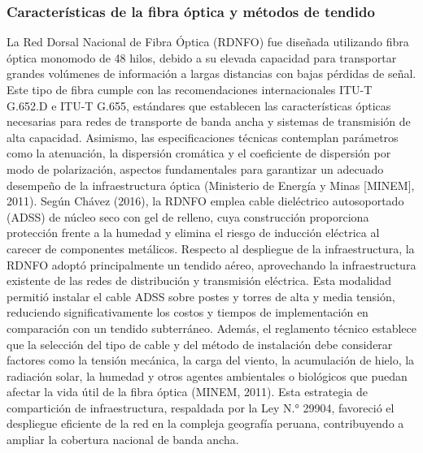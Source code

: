 \subsubsection{Características de la fibra óptica y métodos de tendido}
La Red Dorsal Nacional de Fibra Óptica (RDNFO) fue diseñada utilizando fibra óptica monomodo de 48 hilos, debido a su elevada capacidad para transportar grandes volúmenes de información a largas distancias con bajas pérdidas de señal. Este tipo de fibra cumple con las recomendaciones internacionales ITU-T G.652.D e ITU-T G.655, estándares que establecen las características ópticas necesarias para redes de transporte de banda ancha y sistemas de transmisión de alta capacidad. Asimismo, las especificaciones técnicas contemplan parámetros como la atenuación, la dispersión cromática y el coeficiente de dispersión por modo de polarización, aspectos fundamentales para garantizar un adecuado desempeño de la infraestructura óptica (Ministerio de Energía y Minas [MINEM], 2011). Según Chávez (2016), la RDNFO emplea cable dieléctrico autosoportado (ADSS) de núcleo seco con gel de relleno, cuya construcción proporciona protección frente a la humedad y elimina el riesgo de inducción eléctrica al carecer de componentes metálicos.
Respecto al despliegue de la infraestructura, la RDNFO adoptó principalmente un tendido aéreo, aprovechando la infraestructura existente de las redes de distribución y transmisión eléctrica. Esta modalidad permitió instalar el cable ADSS sobre postes y torres de alta y media tensión, reduciendo significativamente los costos y tiempos de implementación en comparación con un tendido subterráneo. Además, el reglamento técnico establece que la selección del tipo de cable y del método de instalación debe considerar factores como la tensión mecánica, la carga del viento, la acumulación de hielo, la radiación solar, la humedad y otros agentes ambientales o biológicos que puedan afectar la vida útil de la fibra óptica (MINEM, 2011). Esta estrategia de compartición de infraestructura, respaldada por la Ley N.° 29904, favoreció el despliegue eficiente de la red en la compleja geografía peruana, contribuyendo a ampliar la cobertura nacional de banda ancha.
